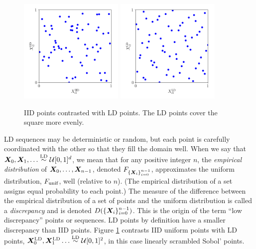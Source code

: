 \documentclass[graybox,footinfo]{svmult}
\newcommand{\LD}{\textup{LD}}
\newcommand{\unif}{\textup{unif}}
\newcommand{\LDsim}{\overset{\LD}{\sim}}
\newcommand{\cube}{[0,1]^d}
\begin{document}
\begin{figure}
	\includegraphics[height=5cm]{QMCSoftwareArticle/figs/dd_iid_uniform_pts.png}
	\qquad
	\includegraphics[height=5cm]{QMCSoftwareArticle/figs/dd_sobol_pts.png}
	\caption{IID points contrasted with LD points.  The LD points cover the square more evenly.}
	\label{fig:comparePts}
\end{figure}

LD sequences may be deterministic or random, but each point is carefully coordinated with the other so that they fill the domain well.  When we say that $\bsX_0, \bsX_1, \ldots \LDsim \calU\cube$, we mean that for any positive integer $n$,  the \emph{empirical distribution} of ${\boldsymbol{X}}_0, \ldots, {\boldsymbol{X}}_{n-1}$, denoted $F_{\{{\boldsymbol{X}}_i\}_{i=0}^{n-1}}$,  approximates the uniform distribution, $F_\unif$, well (relative to $n$).  (The empirical distribution of a set assigns equal probability to each point.)  The measure of the difference between the empirical distribution of a set of points and the uniform distribution is called a \emph{discrepancy} and is denoted $D(\{{\boldsymbol{X}}_i\}_{i=0}^{n-1})$.  This is the origin of the term ``low discrepancy'' points or sequences.  LD points by definition have a smaller discrepancy than IID points.  Figure \ref{fig:comparePts} contrasts IID uniform points with LD points, $\bsX^{\LD}_0, \bsX^{\LD}_1 \ldots \LDsim \calU[0,1]^2$, in this case linearly scrambled Sobol' points.
\end{document}

